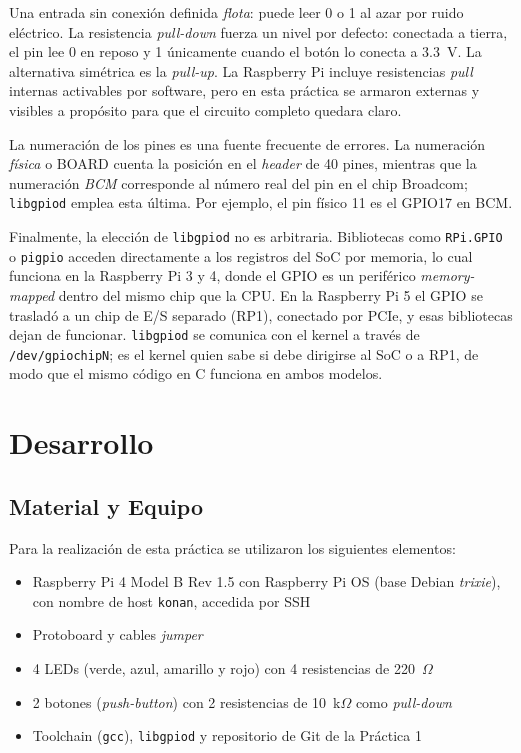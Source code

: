 \documentclass[conference]{IEEEtran}
\begin{document}
Una entrada sin conexión definida \textit{flota}: puede leer 0 o 1 al azar por ruido eléctrico. La resistencia \textit{pull-down} fuerza un nivel por defecto: conectada a tierra, el pin lee 0 en reposo y 1 únicamente cuando el botón lo conecta a 3.3~V. La alternativa simétrica es la \textit{pull-up}. La Raspberry Pi incluye resistencias \textit{pull} internas activables por software, pero en esta práctica se armaron externas y visibles a propósito para que el circuito completo quedara claro.

La numeración de los pines es una fuente frecuente de errores. La numeración \textit{física} o BOARD cuenta la posición en el \textit{header} de 40 pines, mientras que la numeración \textit{BCM} corresponde al número real del pin en el chip Broadcom; \texttt{libgpiod} emplea esta última. Por ejemplo, el pin físico 11 es el GPIO17 en BCM.

Finalmente, la elección de \texttt{libgpiod} no es arbitraria. Bibliotecas como \texttt{RPi.GPIO} o \texttt{pigpio} acceden directamente a los registros del SoC por memoria, lo cual funciona en la Raspberry Pi 3 y 4, donde el GPIO es un periférico \textit{memory-mapped} dentro del mismo chip que la CPU. En la Raspberry Pi 5 el GPIO se trasladó a un chip de E/S separado (RP1), conectado por PCIe, y esas bibliotecas dejan de funcionar. \texttt{libgpiod} se comunica con el kernel a través de \texttt{/dev/gpiochipN}; es el kernel quien sabe si debe dirigirse al SoC o a RP1, de modo que el mismo código en C funciona en ambos modelos.

\section{Desarrollo}

\subsection{Material y Equipo}
Para la realización de esta práctica se utilizaron los siguientes elementos:
\begin{itemize}
	\item Raspberry Pi 4 Model B Rev 1.5 con Raspberry Pi OS (base Debian \textit{trixie}), con nombre de host \texttt{konan}, accedida por SSH
	\item Protoboard y cables \textit{jumper}
	\item 4 LEDs (verde, azul, amarillo y rojo) con 4 resistencias de 220~$\Omega$
	\item 2 botones (\textit{push-button}) con 2 resistencias de 10~k$\Omega$ como \textit{pull-down}
	\item Toolchain (\texttt{gcc}), \texttt{libgpiod} y repositorio de Git de la Práctica 1
\end{itemize}
\end{document}
